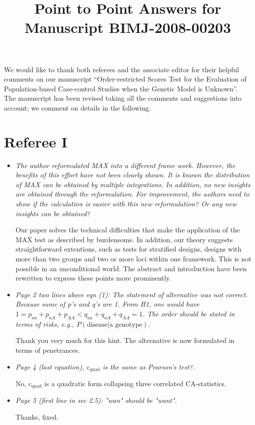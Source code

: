 \documentclass{article}
\title{Point to Point Answers for Manuscript BIMJ-2008-00203}
\begin{document}
\maketitle

We would like to thank both referees and the associate editor for
their helpful comments on our manuscript ``Order-restricted Scores Test for
the Evaluation of Population-based Case-control Studies when the
Genetic Model is Unknown''. The manuscript has been revised taking all 
the comments and suggestions into account; we comment on details
in the following.

\section*{Referee I}

\begin{itemize}
\item \textit{The author reformulated MAX into a different frame work. 
However, the benefits of this effort have not been clearly shown. It is 
known the distribution of MAX can be obtained by multiple integrations. 
In addition, no new insights are obtained through the reformulation.
For improvement, the authors need to show if the calculation is easier 
with this new reformulation? Or any new insights can be obtained?}

Our paper solves the technical difficulties that make
the application of the MAX test as described by 
\cite{Freidlin:2002} burdensome. In addition, our theory
suggests straightforward extentions, such as
tests for stratified designs, designs with more than two
groups and two or more loci within one framework. This is not possible
in an unconditional world. The abstract and introduction have been rewritten
to express these points more prominently.

\item
\textit{Page 2 two lines above eqn (1): The statement of alternative was not 
correct. Because sume of p's and q's are 1. From H1, one would have 
$1 =p_{aa}+p_{aA}+p_{AA} < q_{aa}+q_{aA}+q_{AA}=1$. 
The order should be stated in terms of risks, e.g., $P(\text{disease}|\text{a
genotype})$.}

Thank you very much for this hint. The alternative is now formulated
in terms of penetrances.

\item
\textit{Page 4 (last equation), $c_\text{quad}$ is the same as Pearson's test?}.

No, $c_\text{quad}$ is a quadratic form collapsing three correlated 
CA-statistics.

\item
\textit{Page 5 (first line in sec 2.5): "wan" should be "want".}

Thanks, fixed.
\end{itemize}
\end{document}
